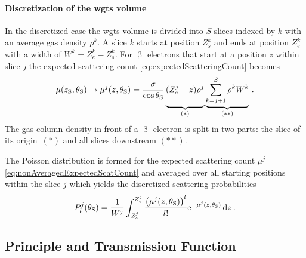 \paragraph{Discretization of the \gls{wgts} volume}
In the discretized case the \gls{wgts} volume is divided into $S$ slices indexed by $k$ with an average gas density $\bar{\rho}^k$. A slice $k$ starts at position $Z_s^k$ and ends at position $Z_e^k$ with a width of $W^k=Z_e^k-Z_s^k$. For $\upbeta$ electrons that start at a position $z$ within slice $j$ the expected scattering count \eqref{eq:expectedScatteringCount} becomes
\begin{equation}
\label{eq:nonAveragedExpectedScatCount}
    \mu(\zSource, \thetaSource) \rightarrow 
    \mu^j(z, \thetaSource) =
    \frac{\sigma}{\cos\thetaSource}
    \underbrace{
        (Z_e^j-z) \bar{\rho}^j
        \vphantom{\sum_{k=j+1}^{S}}
    }_{(*)}
    \underbrace{\sum_{k=j+1}^{S} \bar{\rho}^k W^k}_{(**)}
    \fullstop
\end{equation}
The gas column density in front of a $\upbeta$ electron is split in two parts: the slice of its \mbox{origin $(*)$} and all slices downstream \mbox{$(**)$}. 

The Poisson distribution is formed for the expected scattering count $\mu^j$ \eqref{eq:nonAveragedExpectedScatCount} and averaged over all starting positions within the slice $j$ which yields the discretized scattering probabilities
\begin{equation}
    \label{eq:nonAveragedScatProbs}
    P^j_l(\theta_\mathrm{S}) = 
    \frac{1}{W^j}
    \int_{Z_s^j}^{Z_e^j}
        \frac{
            \left(\mu^j(z,\theta_\mathrm{S})\right)^l
        }{l!}
        \mathrm{e}^{-\mu^j(z,\theta_\mathrm{S})}
    \mathop{}\!\mathrm{d} z
    \text{\,.}
\end{equation}


\subsection{ Principle and Transmission Function}
\label{sec:mace}
\begin{figure}[t]
	\label{fig:mace}
\end{figure}

